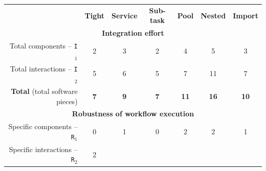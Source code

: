 \documentclass[preprint,3p,twocolumn]{elsarticle}
\begin{document}
\begin{table}
\centering
\begin{tabular}{rcccccc}
                                     & \textbf{Tight}
                                     & \textbf{Service}
                                     & \textbf{Sub-task}
                                     & \textbf{Pool}
                                     & \textbf{Nested}
                                     & \textbf{Import} \\
\multicolumn{7}{c}{\cellcolor[HTML]{EEEEEE}\textbf{Integration effort}}\\
  Total components -- \texttt{I$_1$} & \cellcolor[HTML]{99FF99}2
                                     & \cellcolor[HTML]{99E899}3
                                     & \cellcolor[HTML]{99FF99}2
                                     & \cellcolor[HTML]{99D199}4
                                     & \cellcolor[HTML]{99BB99}5
                                     & \cellcolor[HTML]{99E899}3\\
Total interactions -- \texttt{I$_2$} & \cellcolor[HTML]{99FF99}5
                                     & \cellcolor[HTML]{99F399}6
                                     & \cellcolor[HTML]{99FF99}5
                                     & \cellcolor[HTML]{99E899}7
                                     & \cellcolor[HTML]{99BB99}11
                                     & \cellcolor[HTML]{99E899}7\\
\textbf{Total} (total software pieces) & \cellcolor[HTML]{99FF99}\textbf{7}
                                     & \cellcolor[HTML]{99EF99}\textbf{9}
                                     & \cellcolor[HTML]{99FF99}\textbf{7}
                                     & \cellcolor[HTML]{99E099}\textbf{11}
                                     & \cellcolor[HTML]{99BB99}\textbf{16}
                                     & \cellcolor[HTML]{99E899}\textbf{10}\\
  \multicolumn{7}{c}{\cellcolor[HTML]{EEEEEE}\textbf{Robustness of workflow execution}}\\
Specific components -- \texttt{R$_1$} & \cellcolor[HTML]{99FF99}0
                                     & \cellcolor[HTML]{99DD99}1
                                     & \cellcolor[HTML]{99FF99}0
                                     & \cellcolor[HTML]{99BB99}2
                                     & \cellcolor[HTML]{99BB99}2
                                     & \cellcolor[HTML]{99DD99}1\\
  Specific interactions -- \texttt{R$_2$} & \cellcolor[HTML]{99F199}2

\end{tabular}
\end{table}
\end{document}
